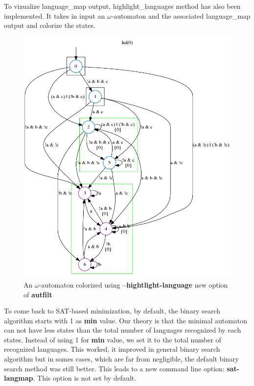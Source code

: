 To vizualize language\_map output, highlight\_languages method has also been implemented. It takes in input
an $\omega$-automaton and the associated language\_map output and colorize the states.\\

\begin{figure}[H]
 \centering
 \includegraphics[scale=0.4]{img/highlight_language.png}
 \caption{An $\omega$-automaton colorized using \textbf{--hightlight-language} new option of
          \textbf{autfilt}}
 \label{fig:highlight_language}
\end{figure}

To come back to SAT-based minimization, by default, the binary search algorithm starts with 1 as
\textbf{min} value. Our theory is that the minimal automaton can not have less states than the total number
of languages recognized by each states. Instead of using 1 for \textbf{min} value, we set it to the total
number of recognized languages. This worked, it improved in general binary search algorithm but in somes
cases, which are far from negligible, the default binary search method was still better. This leads to a
new command line option: \textbf{sat-langmap}. This option is not set by default.